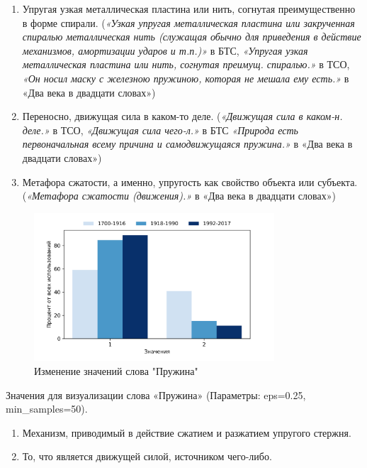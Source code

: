 \begin{enumerate}
    \item Упругая узкая металлическая пластина или нить, согнутая преимущественно в форме спирали.
(\textit{«Узкая упругая металлическая пластина или закрученная спиралью металлическая нить
(служащая обычно для приведения в действие механизмов, амортизации ударов и т.п.)»} в БТС,
\textit{«Упругая узкая металлическая пластина или нить, согнутая преимущ. спиралью.»} в ТСО,
\textit{«Он носил маску с железною пружиною, которая не мешала ему есть.»} в «Два века в двадцати словах»)

    \item Переносно, движущая сила в каком-то деле.
(\textit{«Движущая сила в каком-н. деле.»} в ТСО, \textit{«Движущая сила чего-л.»} в БТС
\textit{«Природа есть первоначальная всему причина и самодвижущаяся пружина.»} в «Два века в двадцати словах»)

    \item Метафора сжатости, а именно, упругость как свойство объекта или субъекта.
(\textit{«Метафора сжатости (движения).»} в «Два века в двадцати словах»)
\end{enumerate}

\begin{figure}[H]
	\centering
	\includegraphics[width=0.8\textwidth]{img/visualizations/pruzhina_minimal}
	\caption{Изменение значений слова "Пружина"}
	\label{fig:Пружина}
\end{figure}

Значения для визуализации слова «Пружина» (Параметры: eps=0.25, min\_samples=50).

\begin{enumerate}
    \item Механизм, приводимый в действие сжатием и разжатием упругого стержня.
    \item То, что является движущей силой, источником чего-либо.
\end{enumerate}

